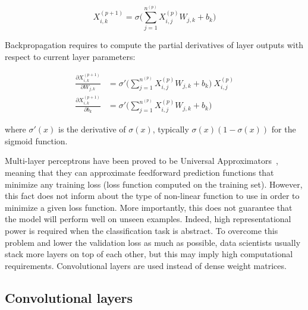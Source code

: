         \begin{equation}
            X_{i, k}^{(p+1)} = \sigma \Big( \sum\limits_{j=1}^{n^{(p)}} X^{(p)}_{i, j} W_{j, k} + b_{k} \Big)
        \end{equation}

        Backpropagation requires to compute the partial derivatives of layer outputs with respect to current layer parameters:

        \begin{align}
            \frac{\partial X_{i, k}^{(p+1)}}{\partial W_{j, k}} & = \sigma' \Big( \sum\limits_{j=1}^{n^{(p)}} X_{i, j}^{(p)} W_{j, k} + b_{k} \Big) \ X_{i, j}^{(p)} \\
            \frac{\partial X_{i, k}^{(p+1)}}{\partial b_{k}} & = \sigma' \Big( \sum\limits_{j=1}^{n^{(p)}} X_{i, j}^{(p)} W_{j, k} + b_{k} \Big)
        \end{align}

        where $\sigma'(x)$ is the derivative of $\sigma(x)$,
        typically $\sigma(x) (1 - \sigma(x))$ for the sigmoid function.

        Multi-layer perceptrons have been proved to be Universal Approximators~\cite{hornik1991approximation},
        meaning that they can approximate feedforward prediction functions that minimize any training loss (loss function computed on the training set).
        However, this fact does not inform about the type of non-linear function to use in order to minimize
        a given loss function. More importantly, this does not guarantee that the model will perform well on unseen examples.
        Indeed, high representational power is required when the classification task is abstract.
        To overcome this problem and lower the validation loss as much as possible, data scientists usually stack more layers on top of each other,
        but this may imply high computational requirements. Convolutional layers are used instead of dense weight matrices.

    \subsection{Convolutional layers} \label{convlayers}

